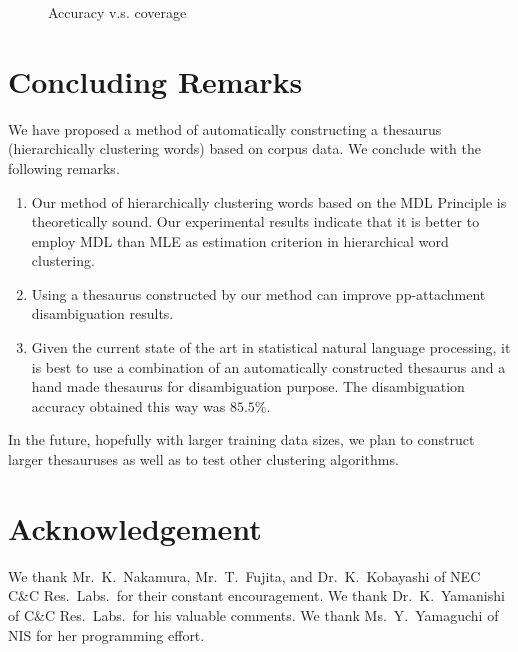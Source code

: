 \begin{figure*}[htb]
\begin{center}
\caption{Accuracy v.s. coverage}
\label{fig:plot} 
\end{center}
\end{figure*}

\section{Concluding Remarks}
We have proposed a method of automatically constructing a thesaurus
(hierarchically clustering words) based on corpus data. We conclude
with the following remarks.
\begin{enumerate}
\item Our method of hierarchically clustering words based on the MDL
  Principle is theoretically sound. Our experimental results indicate
  that it is better to employ MDL than MLE as estimation criterion in
  hierarchical word clustering.
\item Using a thesaurus constructed by our method can improve
 pp-attachment disambiguation results.
\item Given the current state of the art in statistical natural language
 processing, it is best to use a combination of an automatically
 constructed thesaurus and a hand made thesaurus for disambiguation
 purpose. The disambiguation accuracy obtained this way was $85.5\%$.
\end{enumerate}

In the future, hopefully with larger training data sizes, we plan 
to construct larger thesauruses as well as to test other clustering 
algorithms.

\section*{Acknowledgement}

We thank Mr.~K.~Nakamura, Mr.~T.~Fujita, and Dr.~K.~Kobayashi of NEC
C\&C Res.~Labs.~for their constant encouragement. We thank
Dr.~K.~Yamanishi of C\&C Res.~Labs.~for his valuable comments. We
thank Ms.~Y.~Yamaguchi of NIS for her programming effort.




